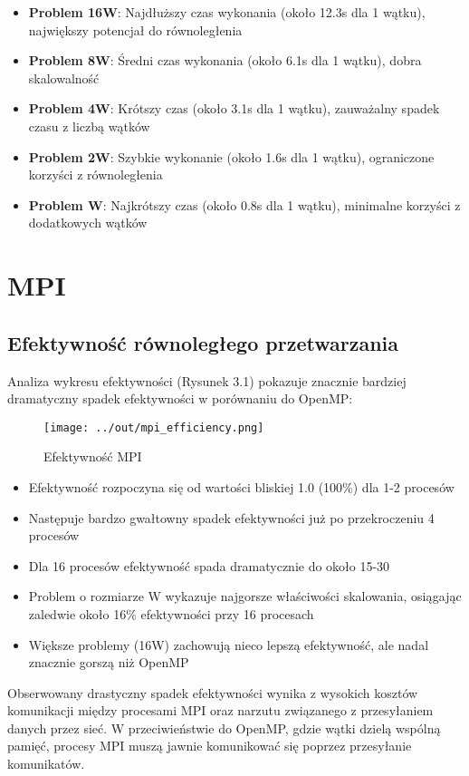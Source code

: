 \documentclass[12pt,a4paper]{report}
\begin{document}
\begin{itemize}
    \item \textbf{Problem 16W}: Najdłuższy czas wykonania (około 12.3s dla 1 wątku), największy potencjał do równoległenia
    \item \textbf{Problem 8W}: Średni czas wykonania (około 6.1s dla 1 wątku), dobra skalowalność
    \item \textbf{Problem 4W}: Krótszy czas (około 3.1s dla 1 wątku), zauważalny spadek czasu z liczbą wątków
    \item \textbf{Problem 2W}: Szybkie wykonanie (około 1.6s dla 1 wątku), ograniczone korzyści z równoległenia
    \item \textbf{Problem W}: Najkrótszy czas (około 0.8s dla 1 wątku), minimalne korzyści z dodatkowych wątków
\end{itemize}

\chapter{MPI}
\section{Efektywność równoległego przetwarzania}
Analiza wykresu efektywności (Rysunek 3.1) pokazuje znacznie bardziej dramatyczny spadek efektywności w porównaniu do OpenMP:
\begin{figure}[h]
    \centering
    \texttt{[image: ../out/mpi\_efficiency.png]}
    \caption{Efektywność MPI}
    \label{fig:mpi_efficiency}
\end{figure}
\begin{itemize}
    \item Efektywność rozpoczyna się od wartości bliskiej 1.0 (100\%) dla 1-2 procesów
    \item Następuje bardzo gwałtowny spadek efektywności już po przekroczeniu 4 procesów
    \item Dla 16 procesów efektywność spada dramatycznie do około 15-30%
    \item Problem o rozmiarze W wykazuje najgorsze właściwości skalowania, osiągając zaledwie około 16\% efektywności przy 16 procesach
    \item Większe problemy (16W) zachowują nieco lepszą efektywność, ale nadal znacznie gorszą niż OpenMP
\end{itemize}

Obserwowany drastyczny spadek efektywności wynika z wysokich kosztów komunikacji między procesami MPI oraz narzutu związanego z przesyłaniem danych przez sieć. W przeciwieństwie do OpenMP, gdzie wątki dzielą wspólną pamięć, procesy MPI muszą jawnie komunikować się poprzez przesyłanie komunikatów.
\end{document}
